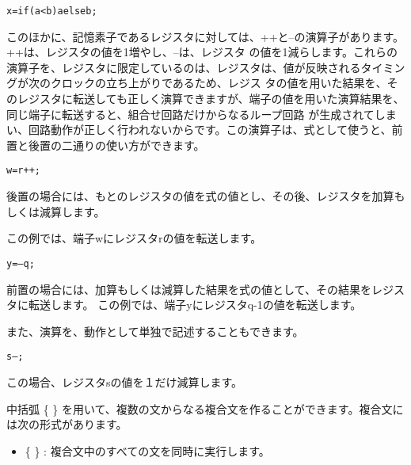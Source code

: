 \begin{reviewemlist}
\begin{alltt}
       x = if(a\textless{}b) a else b;
\end{alltt}
\end{reviewemlist}

このほかに、記憶素子であるレジスタに対しては、++と--の演算子があります。++は、レジスタの値を1増やし、--は、レジスタ の値を1減らします。これらの演算子を、レジスタに限定しているのは、レジスタは、値が反映されるタイミングが次のクロックの立ち上がりであるため、レジス タの値を用いた結果を、そのレジスタに転送しても正しく演算できますが、端子の値を用いた演算結果を、同じ端子に転送すると、組合せ回路だけからなるループ回路 が生成されてしまい、回路動作が正しく行われないからです。この演算子は、式として使うと、前置と後置の二通りの使い方ができます。

\begin{reviewemlist}
\begin{alltt}
       w = r++;
\end{alltt}
\end{reviewemlist}

後置の場合には、もとのレジスタの値を式の値とし、その後、レジスタを加算もしくは減算します。

この例では、端子wにレジスタrの値を転送します。

\begin{reviewemlist}
\begin{alltt}
       y = --q;
\end{alltt}
\end{reviewemlist}

前置の場合には、加算もしくは減算した結果を式の値として、その結果をレジスタに転送します。 この例では、端子yにレジスタq-1の値を転送します。

また、演算を、動作として単独で記述することもできます。

\begin{reviewemlist}
\begin{alltt}
       s--;
\end{alltt}
\end{reviewemlist}

この場合、レジスタsの値を１だけ減算します。

中括弧 \{ \} を用いて、複数の文からなる複合文を作ることができます。複合文には次の形式があります。

\begin{itemize}
\item \{ \} : 複合文中のすべての文を同時に実行します。
\end{itemize}

